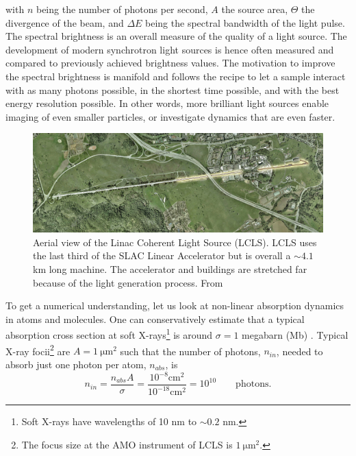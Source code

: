 with $n$ being the number of photons per second, $A$ the source area, $\Theta$ the divergence of the beam, and $\Delta\! E$ being the spectral bandwidth of the light pulse. The spectral brightness is an overall measure of the quality of a light source. The development of modern synchrotron light sources is hence often measured and compared to previously achieved brightness values. The motivation to improve the spectral brightness is manifold and follows the recipe to let a sample interact with as many photons possible, in the shortest time possible, and with the best energy resolution possible. In other words, more brilliant light sources enable imaging of even smaller particles, or investigate dynamics that are even faster.\\[1\baselineskip]
\begin{figure}[t]
	\centering
		\includegraphics[width=1.00\textwidth]{images/aerial-view-lcls.jpg}
	\caption[Aerial view of the Linac Coherent Light Source.]{Aerial view of the Linac Coherent Light Source (LCLS). LCLS uses the last third of the SLAC Linear Accelerator but is overall a $\sim 4.1$ km long machine. The accelerator and buildings are stretched far because of the light generation process. From \cite{SLAC-2009-Flickr}}
	\label{fig:aerial-view-lcls}
\end{figure}
To get a numerical understanding, let us look at non-linear absorption dynamics in atoms and molecules. One can conservatively estimate that a typical absorption cross section at soft X-rays\footnote{Soft X-rays have wavelengths of 10 nm to $\sim 0.2$ nm.} is around $\sigma = 1$ megabarn (Mb) \cite{Bucksbaum-2011-Book}. Typical X-ray focii\footnote{The focus size at the AMO instrument of LCLS is $\SI{1}{\micro\meter\squared}$.} are $A = \SI{1}{\micro\meter\squared}$ such that the number of photons, $n_{in}$, needed to absorb just one photon per atom, $n_{abs}$, is
\begin{equation}
n_{in} = \frac{n_{abs} A}{\sigma} = \frac{10^{-8} \mathrm{cm}^{2}}{10^{-18} \mathrm{cm}^{2}}=10^{10}\qquad \mathrm{photons.}
\label{eq:absorption-cross-section}
\end{equation}
